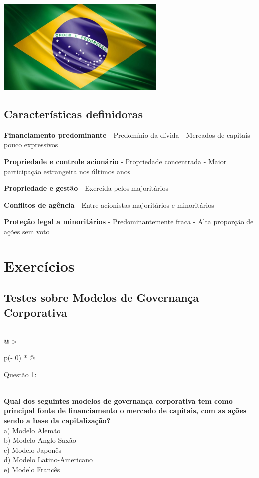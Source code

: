 \documentclass[
]{book}
\begin{document}
\includegraphics[width=3.1875in,height=\textheight]{images/02-2025-08-12_13/10-modelo_latino_americano.jpg}

\subsection{Características definidoras}\label{caracteruxedsticas-definidoras-4}

\textbf{Financiamento predominante} - Predomínio da dívida - Mercados de capitais pouco expressivos

\textbf{Propriedade e controle acionário} - Propriedade concentrada - Maior participação estrangeira nos últimos anos

\textbf{Propriedade e gestão} - Exercida pelos majoritários

\textbf{Conflitos de agência} - Entre acionistas majoritários e minoritários

\textbf{Proteção legal a minoritários} - Predominantemente fraca - Alta proporção de ações sem voto

\section{Exercícios}\label{exercuxedcios}

\subsection{Testes sobre Modelos de Governança Corporativa}\label{testes-sobre-modelos-de-governanuxe7a-corporativa}

\begin{center}\rule{0.5\linewidth}{0.5pt}\end{center}

\begin{longtable}[]{@{}
  >{\raggedright\arraybackslash}p{(\columnwidth - 0\tabcolsep) * }@{}}
\toprule\noalign{}
\begin{minipage}[b]{\linewidth}\raggedright
Questão 1:
\end{minipage} \\
\midrule\noalign{}
\endhead
\bottomrule\noalign{}
\endlastfoot
\textbf{Qual dos seguintes modelos de governança corporativa tem como principal fonte de financiamento o mercado de capitais, com as ações sendo a base da capitalização?} \\
a) Modelo Alemão \\
b) Modelo Anglo-Saxão \\
c) Modelo Japonês \\
d) Modelo Latino-Americano \\
e) Modelo Francês \\
\end{longtable}
\end{document}
